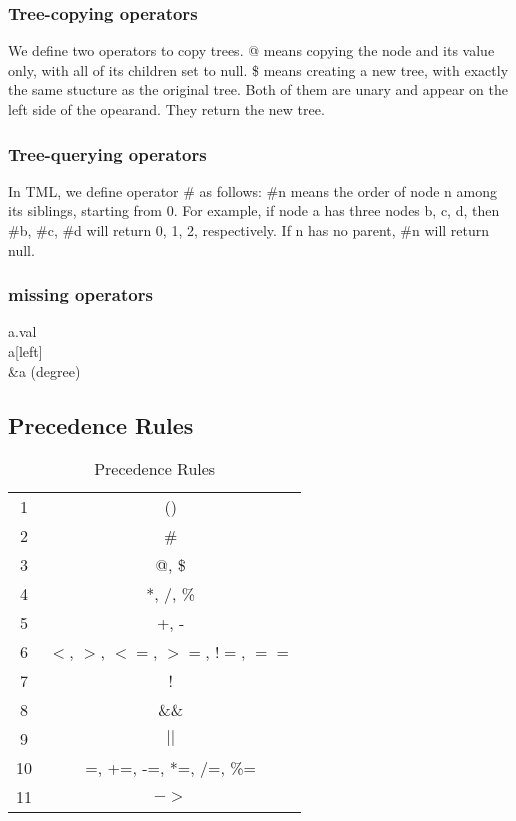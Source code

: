 \documentclass[12pt,psfig,a4]{article}
\begin{document}
\subsubsection{Tree-copying operators}
We define two operators to copy trees. @ means copying the node and its value only, with all of its children set to null. \$ means creating a new tree, with exactly the same stucture as the original tree. Both of them are unary and appear on the left side of the opearand. They return the new tree.

\subsubsection{Tree-querying operators}
In TML, we define operator \# as follows: \#n means the order of node n among its siblings, starting from 0. For example, if node a has three nodes b, c, d, then \#b, \#c, \#d will return 0, 1, 2, respectively. If n has no parent, \#n will return null.

\subsubsection {missing operators}
a.val\\a[left]\\ \&a  (degree)

\subsection{Precedence Rules}
\begin{table}[ht]
\begin{center}
\begin{tabular}{| c | c |}
\hline
1 & () \\
2 & \# \\
3 & @, \$ \\
4 & *, /, \% \\
5 & +, - \\
6 & $<$, $>$, $<=$, $>=$, $!=$, $==$ \\
7 & ! \\
8 & \&\& \\
9 & $||$ \\
10 & =, +=, -=, *=, /=, \%= \\
11 & $->$ \\
\hline
\end{tabular}
\caption{Precedence Rules}
\label{preRule}
\end {center}
\end{table}
\end{document}
